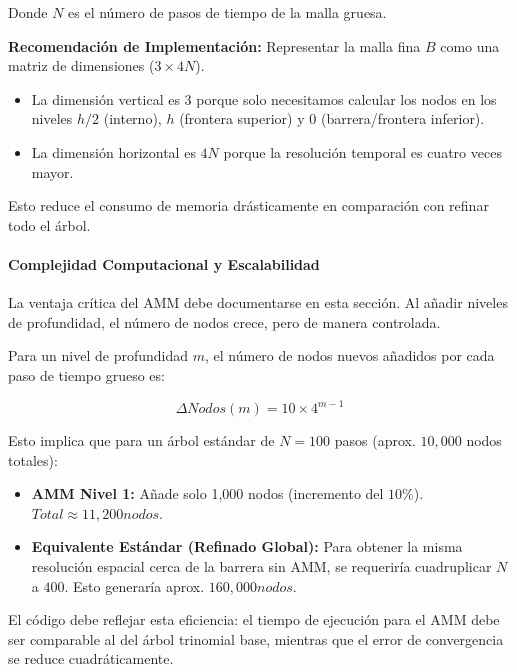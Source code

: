 Donde $N$ es el número de pasos de tiempo de la malla gruesa.

\textbf{Recomendación de Implementación:} Representar la malla fina $B$ como una matriz de dimensiones ($3\times 4N$). 

\begin{itemize} 
  \item La dimensión vertical es $3$ porque solo necesitamos calcular los nodos en los niveles $h/2$ (interno), $h$ (frontera superior) y $0$ (barrera/frontera inferior). 
  
  \item La dimensión horizontal es $4N$ porque la resolución temporal es cuatro veces mayor. 
\end{itemize} 
Esto reduce el consumo de memoria drásticamente en comparación con refinar todo el árbol.

\paragraph{Complejidad Computacional y Escalabilidad} 

La ventaja crítica del AMM debe documentarse en esta sección. Al añadir niveles de profundidad, el número de nodos crece, pero de manera controlada.

Para un nivel de profundidad $m$, el número de nodos nuevos añadidos por cada paso de tiempo grueso es: 

\begin{equation} 
  \Delta Nodos(m) = 10 \times 4^{m-1} 
\end{equation}

Esto implica que para un árbol estándar de $N=100$ pasos (aprox. $10,000$ nodos totales): 

\begin{itemize} 
  \item \textbf{AMM Nivel 1:} Añade solo 1,000 nodos (incremento del $10\%$). $Total \approx 11,200 nodos$. 
  
  \item \textbf{Equivalente Estándar (Refinado Global):} Para obtener la misma resolución espacial cerca de la barrera sin AMM, se requeriría cuadruplicar $N$ a $400$. Esto generaría aprox. $160,000 nodos$. 
\end{itemize}

El código debe reflejar esta eficiencia: el tiempo de ejecución para el AMM debe ser comparable al del árbol trinomial base, mientras que el error de convergencia se reduce cuadráticamente.

